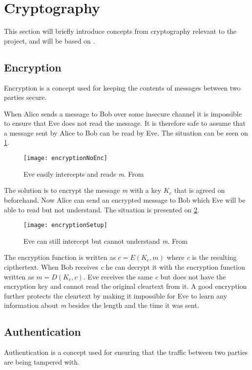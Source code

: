 \section{Cryptography}\label{cryptography}
This section will briefly introduce concepts from cryptography relevant to the project, and will be based on \cite{cryptoenginering}.

\subsection{Encryption}
Encryption is a concept used for keeping the contents of messages between two parties secure.

When Alice sends a message to Bob over some insecure channel it is impossible to ensure that Eve does not read the message.
It is therefore safe to assume that a message sent by Alice to Bob can be read by Eve.
The situation can be seen on \cref{crypto:noenc}.

\begin{figure}[H]
	\centering
	\texttt{[image: encryptionNoEnc]}
	\caption{Eve easily intercepts and reads \emph{m}. From \citet[p.~50]{cryptoenginering}}
	\label{crypto:noenc}
\end{figure}

The solution is to encrypt the message \emph{m} with a key $K_e$ that is agreed on beforehand.
Now Alice can send an encrypted message to Bob which Eve will be able to read but not understand.
The situation is presented on \cref{crypto:enc}.

\begin{figure}[H]
	\centering
	\texttt{[image: encryptionSetup]}
	\caption{Eve can still intercept but cannot understand \emph{m}. From \citet[p.~50]{cryptoenginering}}
	\label{crypto:enc}
\end{figure}

The encryption function is written as $c = E(K_e,m)$ where \emph{c} is the resulting cipthertext.
When Bob receives \emph{c} he can decrypt it with the encryption function written as $m = D(K_e,c)$.
Eve receives the same \emph{c} but does not have the encryption key and cannot read the original cleartext from it.
A good encryption further protects the cleartext by making it impossible for Eve to learn any information about \emph{m} besides the length and the time it was sent.


\subsection{Authentication}
Authentication is a concept used for ensuring that the traffic between two parties are being tampered with.

